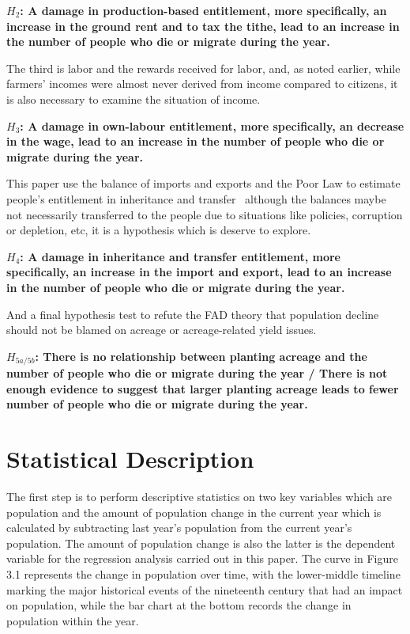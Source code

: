 \textbf{$H_2$: A damage in production-based entitlement, more specifically, an increase in the ground rent and to tax the tithe, lead to an increase in the number of people who die or migrate during the year.}

The third is labor and the rewards received for labor, and, as noted earlier, while farmers' incomes were almost never derived from income compared to citizens, it is also necessary to examine the situation of income.

\textbf{$H_3$: A damage in own-labour entitlement, more specifically, an decrease in the wage, lead to an increase in the number of people who die or migrate during the year.}

This paper use the balance of imports and exports and the Poor Law to estimate people's entitlement in inheritance and transfer \textemdash\
although the balances maybe not necessarily transferred to the people due to situations like policies, corruption or depletion, etc, it is a hypothesis which is deserve to explore.

\textbf{$H_4$: A damage in inheritance and transfer entitlement, more specifically, an increase in the import and export, lead to an increase in the number of people who die or migrate during the year.}

And a final hypothesis test to refute the FAD theory that population decline should not be blamed on acreage or acreage-related yield issues.

\textbf{$H_{5a/5b}$: There is no relationship between planting acreage and the number of people who die or migrate during the year / There is not enough evidence to suggest that larger planting acreage leads to fewer number of people who die or migrate during the year.}

\section{Statistical Description}
The first step is to perform descriptive statistics on two key variables which are population and the amount of population change in the current year which is calculated by subtracting last year's population from the current year's population. The amount of population change is also the latter is the dependent variable for the regression analysis carried out in this paper. The curve in Figure 3.1 represents the change in population over time, with the lower-middle timeline marking the major historical events of the nineteenth century that had an impact on population, while the bar chart at the bottom records the change in population within the year.

